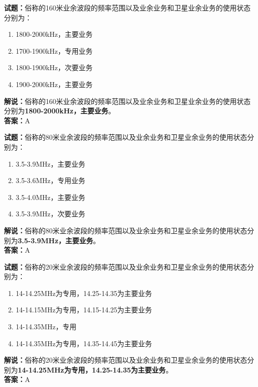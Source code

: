 \documentclass{ctexbook}
\begin{document}
\bigskip




\noindent\textbf{试题：}俗称的160米业余波段的频率范围以及业余业务和卫星业余业务的使用状态分别为：
\begin{enumerate}[leftmargin=3em]
\item 1800-2000\unit{\kHz}，主要业务
\item 1700-1900\unit{\kHz}，专用业务
\item 1800-1900\unit{\kHz}，次要业务
\item 1900-2000\unit{\kHz}，主要业务
\end{enumerate}
\noindent\textbf{解说：}俗称的160米业余波段的频率范围以及业余业务和卫星业余业务的使用状态分别为\textbf{1800-2000\unit{\kHz}，主要业务}。\\\noindent\textbf{答案：}A

\bigskip




\noindent\textbf{试题：}俗称的80米业余波段的频率范围以及业余业务和卫星业余业务的使用状态分别为：
\begin{enumerate}[leftmargin=3em]
\item 3.5-3.9\unit{\MHz}，主要业务
\item 3.5-3.6\unit{\MHz}，专用业务
\item 3.5-4.0\unit{\MHz}，主要业务
\item 3.5-3.9\unit{\MHz}，次要业务
\end{enumerate}
\noindent\textbf{解说：}俗称的80米业余波段的频率范围以及业余业务和卫星业余业务的使用状态分别为\textbf{3.5-3.9\unit{\MHz}，主要业务}。\\\noindent\textbf{答案：}A

\bigskip




\noindent\textbf{试题：}俗称的20米业余波段的频率范围以及业余业务和卫星业余业务的使用状态分别为：
\begin{enumerate}[leftmargin=3em]
\item 14-14.25\unit{\MHz}为专用，14.25-14.35为主要业务
\item 14-14.15\unit{\MHz}为专用，14.15-14.25为主要业务
\item 14-14.35\unit{\MHz}，专用
\item 14-14.35\unit{\MHz}为专用，14.35-14.45为主要业务
\end{enumerate}
\noindent\textbf{解说：}俗称的20米业余波段的频率范围以及业余业务和卫星业余业务的使用状态分别为\textbf{14-14.25\unit{\MHz}为专用，14.25-14.35为主要业务}。\\\noindent\textbf{答案：}A
\end{document}
